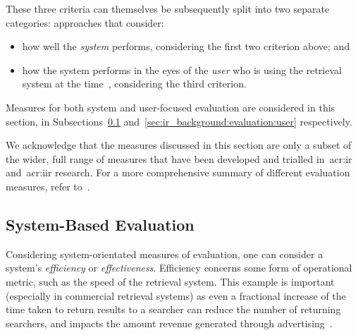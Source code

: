 These three criteria can themselves be subsequently split into two separate categories: approaches that consider:

\begin{itemize}
    \item{how well the \emph{system} performs, considering the first two criterion above; and}
    \item{how the system performs in the eyes of the \emph{user} who is using the retrieval system at the time~\citep{voorhees2005trec_book}, considering the third criterion.}
\end{itemize}

Measures for both system and user-focused evaluation are considered in this section, in Subsections~\ref{sec:ir_background:evaluation:system} and~\ref{sec:ir_background:evaluation:user} respectively.

We acknowledge that the measures discussed in this section are only a subset of the wider, full range of measures that have been developed and trialled in~\gls{acr:ir} and~\gls{acr:iir} research. For a more comprehensive summary of different evaluation measures, refer to~\cite{sanderson2010test}.

\subsection{System-Based Evaluation}\label{sec:ir_background:evaluation:system}
Considering system-orientated measures of evaluation, one can consider a system's \emph{efficiency} or \emph{effectiveness}. Efficiency concerns some form of operational metric, such as the speed of the retrieval system. This example is important (especially in commercial retrieval systems) as even a fractional increase of the time taken to return results to a searcher can reduce the number of returning searchers, and impacts the amount revenue generated through advertising~\citep{brutlag2009speed}.

